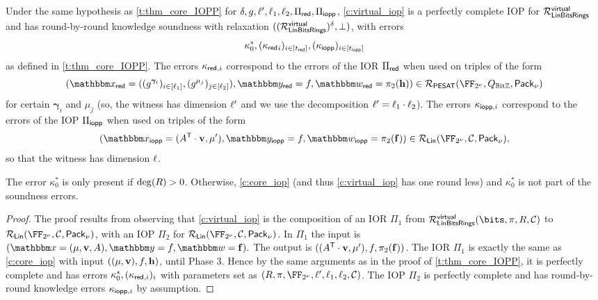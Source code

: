 \documentclass[11pt,letterpaper,usenames,dvipsnames]{article}
\begin{document}
\begin{theorem}\label{t:virtual_iop} 
 
   Under the same hypothesis as \cref{t:thm_core_IOPP} for $\delta,g, \ell',\ell_1, \ell_2, \Pi_{\mathsf{red}}, \Pi_{\mathsf{iopp}}$,  \cref{c:virtual_iop} is a perfectly complete IOP for $\mathcal{R}_{\mathsf{LinBitsRings}}^{\mathsf{virtual}}$  and has round-by-round knowledge soundness with relaxation $((\mathcal{R}_{\mathsf{LinBitsRings}}^{\mathsf{virtual}})^{\delta}, \bot)$, with errors $$\kappa_0^*, ({\kappa_{\mathsf{red}}}_i)_{i\in [t_{\mathsf{red}}]}, ({\kappa_{\mathsf{iopp}}})_{i\in [t_{\mathsf{iopp}}]}$$ as defined in \cref{t:thm_core_IOPP}.  
   The errors $\kappa_{\mathsf{red},i}$ correspond to the errors of  the IOR $\Pi_{\mathsf{red}}$ when used on triples of the form $$(\inp_\red=((g^{\bm{\gamma}_i})_{i\in [\codedim_1]}, (g^{\mu_j})_{j\in [\codedim_2]}), \oracle_\red=f, \wit_\red =\pi_2(\bfh))\in \PESAT(\comfield,Q_{\mathbb{B}\text{it}\ZZ}, \pack)$$ for certain $\bm{\gamma}_i$ and $\mu_j$ (so, the witness has dimension $\ell'$ and we use the decomposition $\ell' = \ell_1 \cdot \ell_2$). The errors $\kappa_{\mathsf{iopp},i}$ correspond to the errors of  the IOP $\Pi_{\mathsf{iopp}}$ when used on triples of the form $$(\inp_\iopp=(\Mmatrix^\mathsf{T} \cdot \vv, \mu'), \oracle_\iopp=f, \wit_\iopp=\pi_2(\bff))\in \LIN(\comfield,\cC,\pack),$$
    so that the witness has dimension $\ell$.


    The error $\kappa_0^*$ is only present if $\deg(R)>0$. Otherwise, \cref{c:core_iop} (and thus \cref{c:virtual_iop} has one round less) and $\kappa_0^*$ is not part of the soundness errors. 
\end{theorem}
\begin{proof}
     The proof results from observing that \cref{c:virtual_iop} is the composition of an IOR $\Pi_1$ from $\LinBitsDual^{\mathsf{virtual}}(\bits, \pi, R,\cC)$ to $\LIN(\comfield,\cC, \pack)$, with an IOP $\Pi_2$ for $\LIN(\comfield,\cC, \pack)$.  In $\Pi_1$ the input is $(\inp=(\mu,\vv, \Mmatrix), \oracle = f, \wit=\bff).$ The output is $((A^{\mathsf{T}}\cdot \mathbf{v}, \mu'), f, \pi_2(\mathbf{f}))$. The IOR  $\Pi_1$ is exactly the same as \cref{c:core_iop}  with input $((\mu, \mathbf{v}), f, \mathbf{h})$, until Phase 3. Hence by the same arguments as in the proof of \cref{t:thm_core_IOPP}, it is perfectly complete and has errors $\kappa_0^*, (\kappa_{\mathsf{red},i})_i$ with parameters set as $(R,\pi, \comfield,\codedim',\codedim_1,\codedim_2,\cC)$. The IOP $\Pi_2$ is perfectly complete and has round-by-round knowledge errors $\kappa_{\mathsf{iopp}, i}$ by assumption.
\end{proof}
\end{document}
